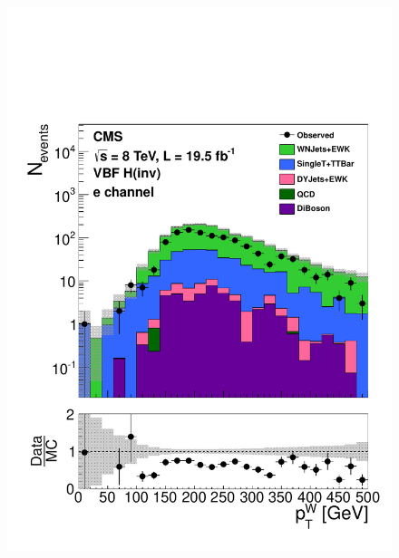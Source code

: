 \begin{figure}
  \includegraphics[width=.6\largefigwidth]{plots/prompt/AN-12-403-figs/hWEl_WpT.pdf}

\end{figure}
